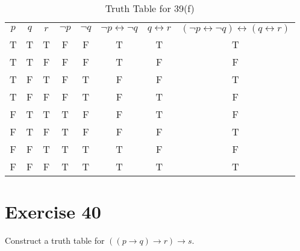 \documentclass{Axon}
\begin{document}
\begin{table}[ht]
    \centering
    \begin{tabular}{c|c|c|c|c|c|c|c}
    \(p\) & \(q\) & \(r\) & \(\lnot p\) & \(\lnot q\) & \(\lnot p \leftrightarrow \lnot q\) & \(q \leftrightarrow r\) & \((\lnot p \leftrightarrow \lnot q) \leftrightarrow (q \leftrightarrow r)\) \\
    T     & T     & T     & F           & F           & T                                   & T                       & T                                                                           \\
    T     & T     & F     & F           & F           & T                                   & F                       & F                                                                           \\
    T     & F     & T     & F           & T           & F                                   & F                       & T                                                                           \\
    T     & F     & F     & F           & T           & F                                   & T                       & F                                                                           \\
    F     & T     & T     & T           & F           & F                                   & T                       & F                                                                           \\
    F     & T     & F     & T           & F           & F                                   & F                       & T                                                                           \\
    F     & F     & T     & T           & T           & T                                   & F                       & F                                                                           \\
    F     & F     & F     & T           & T           & T                                   & T                       & T
    \end{tabular}
    \caption{Truth Table for 39(f)}
\end{table}

\section*{Exercise 40}
Construct a truth table for \(((p \to q) \to r) \to s\).
\end{document}
